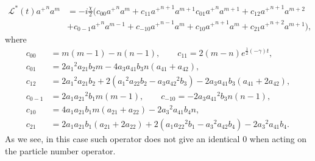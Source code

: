 \documentclass[12pt]{article}
\theoremstyle{definition}
\begin{document}
	\begin{align}
		\label{eq:ActOfGenOnExpr}
		\mathcal{L}^*(t){a^+}^na^m &= -i\frac{\chi}{2}(c_{00}{a^+}^na^m + c_{11}{a^+}^{n+1}a^{m+1} c_{01}{a^+}^na^{m + 1} + c_{12}{a^+}^{n + 1}a^{m + 2} \nonumber\\&+ c_{0-1}{a^+}^na^{m-1} + c_{-10}{a^+}^{n - 1}a^m + c_{10}{a^+}^{n+1}a^m + c_{21}{a^+}^{n+2}a^{m+1}),
	\end{align}
	where
	\begin{align*}
		c_{00} &= m (m-1)-n (n-1), \qquad
		c_{11} = 2 (m-n) e^{\frac{1}{2} (-\gamma ) t}, \\
		c_{01} &= 2 {a_1}^2 {a_{21}} {b_2} m-4 {a_3} {a_{41}} {b_3} n ({a_{41}}+{a_{42}}),\\
		c_{12} &= 2 {a_1}^2 {a_{21}} {b_2}+2 \left({a_1}^2 {a_{22}} {b_2}-{a_3} {a_{42}}^2 {b_3}\right)-2 {a_3} {a_{41}} {b_3} ({a_{41}}+2 {a_{42}}),\\
		c_{0-1} &= 2 {a_1} {a_{21}}^2 {b_1} m (m-1),\qquad
		c_{-10} =-2 {a_3} {a_{41}}^2 {b_3} n (n-1),\\
		c_{10} &= 4 {a_1} {a_{21}} {b_1} m ({a_{21}}+{a_{22}})-2 {a_3}^2 {a_{41}} {b_4} n,\\
		c_{21} &= 2 {a_1} {a_{21}} {b_1} ({a_{21}}+2 {a_{22}})+2 \left({a_1} {a_{22}}^2 {b_1}-{a_3}^2 {a_{42}} {b_4}\right)-2 {a_3}^2 {a_41} {b_4}.
	\end{align*}
	As we see, in this case such operator does not give an identical 0 when acting on the particle number operator.
	
	
	
\end{document}
